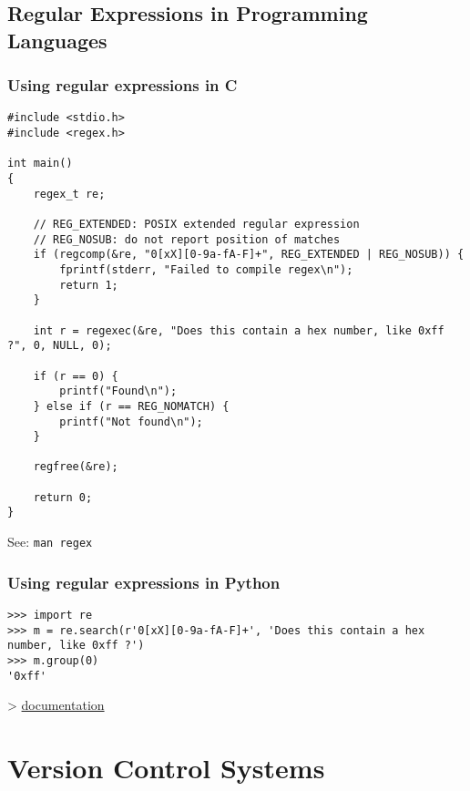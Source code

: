 \documentclass[12pt]{article}
\begin{document}
\subsection{Regular Expressions in Programming Languages}
\subsubsection{Using regular expressions in C}
\begin{verbatim}
#include <stdio.h>
#include <regex.h>

int main()
{
    regex_t re;
    
    // REG_EXTENDED: POSIX extended regular expression
    // REG_NOSUB: do not report position of matches
    if (regcomp(&re, "0[xX][0-9a-fA-F]+", REG_EXTENDED | REG_NOSUB)) {
        fprintf(stderr, "Failed to compile regex\n");
        return 1;
    }

    int r = regexec(&re, "Does this contain a hex number, like 0xff ?", 0, NULL, 0);

    if (r == 0) {
        printf("Found\n");
    } else if (r == REG_NOMATCH) {
        printf("Not found\n");
    }
    
    regfree(&re);

    return 0;
}
\end{verbatim}
See: \texttt{man regex}

\subsubsection{Using regular expressions in Python}
\begin{verbatim}
>>> import re
>>> m = re.search(r'0[xX][0-9a-fA-F]+', 'Does this contain a hex number, like 0xff ?')
>>> m.group(0)
'0xff'
\end{verbatim}

\textgreater{} \href{https://docs.python.org/3/library/re.html}{documentation}






















\newpage
\section{Version Control Systems}
\end{document}
